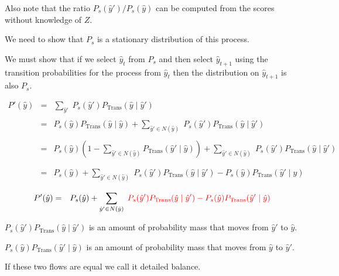 {\vfill
Also note that the ratio $P_s(\hat{y}')/P_s(\hat{y})$ can be computed from the scores without knowledge of $Z$.

We need to show that $P_s$ is a stationary distribution of this process.

\vfill
We must show that if we select $\hat{y}_t$ from $P_s$ and then select $\hat{y}_{t+1}$ using the transition probabilities for the process from $\hat{y}_t$
then the distribution on $\hat{y}_{t+1}$ is also $P_s$.


{\huge
\begin{eqnarray*}
P'(\hat{y}) & = & \sum_{\hat{y}'}\;P_s(\hat{y}')P_{\mathrm{Trans}}(\hat{y}\;|\;\hat{y}') \\
\\
& = & P_s(\hat{y})P_{\mathrm{Trans}}(\hat{y}\;|\;\hat{y}) + \sum_{\hat{y}' \in N(\hat{y})}\;P_s(\hat{y}')P_{\mathrm{Trans}}(\hat{y}\;|\;\hat{y}') \\
\\
& = & P_s(\hat{y})\left(1 - \sum_{\hat{y}' \in N(\hat{y})} P_{\mathrm{Trans}}(\hat{y}'\;|\;\hat{y})\right) + \sum_{\hat{y}' \in N(\hat{y})}\;P_s(\hat{y}')P_{\mathrm{Trans}}(\hat{y}\;|\;\hat{y}') \\
\\
\\
& = & P_s(\hat{y}) + \sum_{\hat{y}' \in N(\hat{y})}\;P_s(\hat{y}')P_{\mathrm{Trans}}(\hat{y}\;|\;\hat{y}') - P_s(\hat{y})P_{\mathrm{Trans}}(\hat{y}'\;|\;\hat{y})
\end{eqnarray*}
}


{\huge
\begin{eqnarray*}
P'(\hat{y}) & = & P_s(\hat{y}) + \sum_{\hat{y}' \in N(\hat{y})}\;{\color{red} P_s(\hat{y}')P_{\mathrm{Trans}}(\hat{y}\;|\;\hat{y}') - P_s(\hat{y})P_{\mathrm{Trans}}(\hat{y}'\;|\;\hat{y})}
\end{eqnarray*}
}

\vfill
{\color{red} $P_s(\hat{y}')P_{\mathrm{Trans}}(\hat{y}\;|\;\hat{y}')$} is an amount of probability mass that moves from $\hat{y}'$ to $\hat{y}$.

\vfill
{\color{red} $P_s(\hat{y})P_{\mathrm{Trans}}(\hat{y}'\;|\;\hat{y})$} is an amount of probability mass that moves from $\hat{y}$ to $\hat{y}'$.

\vfill
If these two flows are equal we call it {\color{red} detailed balance}.

}
